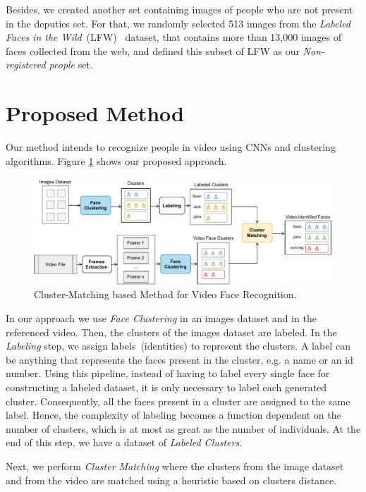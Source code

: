Besides, we created another set containing images of people who are not present in the deputies set.
For that, we randomly selected 513 images from the \emph{Labeled Faces in the Wild}~(LFW)~\cite{LFWTech} dataset, that contains more than 13,000 images of faces collected from the web,
and defined this subset of LFW as our \emph{Non-registered people} set.

\section{Proposed Method}
\label{sec:recognition_method}

Our method intends to recognize people in video using CNNs and clustering algorithms.
Figure \ref{fig:cluster_matching} shows our proposed approach.

\begin{figure}[!ht]
    \centering
    \includegraphics[width=\textwidth]{img/face_clustering/cluster_matching_process.pdf}
    \caption{Cluster-Matching based Method for Video Face Recognition.}
    \label{fig:cluster_matching}
\end{figure}

In our approach we use \emph{Face Clustering} in an images dataset and in the referenced video. Then, the clusters of the images dataset are labeled. 
In the \textit{Labeling} step, we assign labels~(identities) to represent the clusters.
A label can be anything that represents the faces present in the cluster, e.g. a name or an id number. 
Using this pipeline, instead of having to label every single face for constructing a labeled dataset, it is only necessary to label each generated cluster.
Consequently, all the faces present in a cluster are assigned to the same label. 
Hence, the complexity of labeling becomes a function dependent on the number of clusters, which is at most as great as the number of individuals.
At the end of this step, we have a dataset of \emph{Labeled Clusters}.


Next, we perform \emph{Cluster Matching} where the clusters from the image dataset and from the video are matched using a heuristic based on clusters distance.

